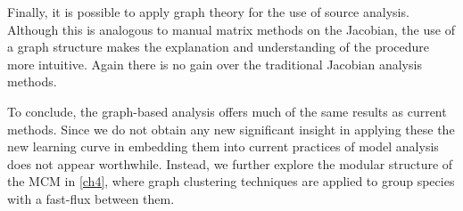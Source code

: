 Finally, it is possible to apply graph theory for the use of source analysis. Although this is analogous to manual matrix methods on the Jacobian, the use of a graph structure makes the explanation and understanding of the procedure more intuitive. Again there is no gain over the traditional Jacobian analysis methods.

To conclude, the graph-based analysis offers much of the same results as current methods. Since we do not obtain any new significant insight in applying these the new learning curve in embedding them into current practices of model analysis does not appear worthwhile. Instead, we further explore the modular structure of the MCM in \autoref{ch4}, where graph clustering techniques are applied to group species with a fast-flux between them.












%
